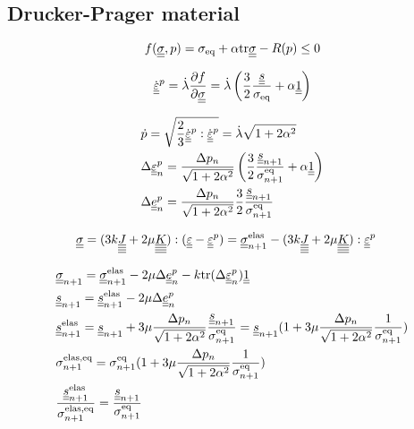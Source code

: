 \documentclass[12pt]{article}
\begin{document}
\newpage
\begin{appendices}
    \section{Drucker-Prager material}
    \label{appendix:DP}

    \begin{equation}
        f(\uusigma, p) = \sigma_{\text{eq}} + \alpha \mtr \uusigma - R(p) \leq 0
    \end{equation}

    \begin{equation}
        \dot{\uueps}^p = \dot{\lambda} \frac{\partial f}{\partial \uusigma} = \dot{\lambda} \left(\frac{3}{2} \frac{\uus}{\sigma_\text{eq}} + \alpha \uuUnit \right)
    \end{equation}

    \begin{align}
        & \dot{p} = \sqrt{\frac{2}{3} \dot{\uueps}^p : \dot{\uueps}^p} = \dot{\lambda}\sqrt{1 + 2\alpha^2} \\
        & \Deltaepsp = \frac{\Delta p_n}{\sqrt{1 + 2\alpha^2}} \left( \frac{3}{2} \frac{\uusn}{\sigmaeqn} + \alpha \uuUnit \right) \\
        & \Deltaep = \frac{\Delta p_n}{\sqrt{1 + 2\alpha^2}} \frac{3}{2} \frac{\uusn}{\sigmaeqn} 
    \end{align}

    \begin{align}
        & \uusigma = (3k\uuuuJ + 2\mu\uuuuK) : (\uueps - \uueps^p) = \uusigma_{n+1}^\text{elas} - (3k\uuuuJ + 2\mu\uuuuK) : \uueps^p
    \end{align}

    \begin{align}
        & \uusigma_{n+1} = \uusigma_{n+1}^\text{elas} - 2\mu \Deltaep - k \mtr (\Deltaepsp) \uuUnit \\
        & \uus_{n+1} = \uus_{n+1}^\text{elas} - 2\mu\Deltaep \\
        & \uus_{n+1}^\text{elas} = \uus_{n+1} + 3\mu\frac{\Delta p_n}{\sqrt{1 + 2\alpha^2}} \frac{\uusn}{\sigmaeqn} = \uus_{n+1} (1 +  3\mu\frac{\Delta p_n}{\sqrt{1 + 2\alpha^2}} \frac{1}{\sigmaeqn}) \\
        & \sigmaeqnelas = \sigmaeqn (1 +  3\mu\frac{\Delta p_n}{\sqrt{1 + 2\alpha^2}} \frac{1}{\sigmaeqn}) \\
        & \frac{\uusnelas}{\sigmaeqnelas} = \frac{\uusn}{\sigmaeqn}
    \end{align}


\end{appendices}
\end{document}
